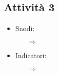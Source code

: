 \subsection{Attività 3}

\paragraph{}

\begin{itemize}
    \item Snodi:
    \begin{itemize}
        \item [$\Rightarrow$]
    \end{itemize}
    \item Indicatori:
    \begin{itemize}
        \item [$\Rightarrow$]
    \end{itemize}
\end{itemize}